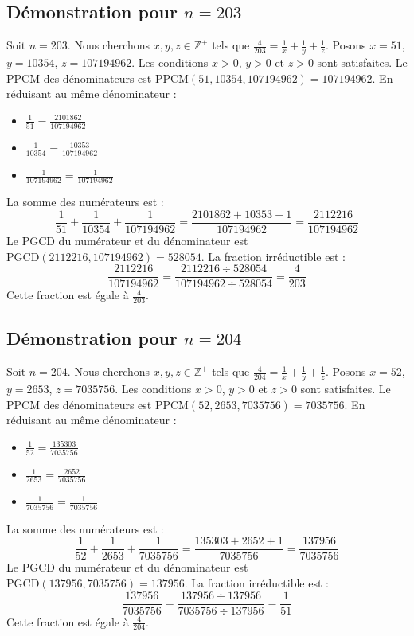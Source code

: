 \documentclass[11pt,a4paper]{article}
\begin{document}
\subsection{Démonstration pour $n = 203$}
Soit $n = 203$. Nous cherchons $x, y, z \in \mathbb{Z}^{+}$ tels que $\frac{4}{203} = \frac{1}{x} + \frac{1}{y} + \frac{1}{z}$.
Posons $x = 51$, $y = 10354$, $z = 107194962$.
Les conditions $x > 0$, $y > 0$ et $z > 0$ sont satisfaites.
Le PPCM des dénominateurs est $\text{PPCM}(51, 10354, 107194962) = 107194962$.
En réduisant au même dénominateur :
\begin{itemize}
    \item $\frac{1}{51} = \frac{2101862}{107194962}$
    \item $\frac{1}{10354} = \frac{10353}{107194962}$
    \item $\frac{1}{107194962} = \frac{1}{107194962}$
\end{itemize}
La somme des numérateurs est :
$$ \frac{1}{51} + \frac{1}{10354} + \frac{1}{107194962} = \frac{2101862 + 10353 + 1}{107194962} = \frac{2112216}{107194962} $$
Le PGCD du numérateur et du dénominateur est $\text{PGCD}(2112216, 107194962) = 528054$.
La fraction irréductible est :
$$ \frac{2112216}{107194962} = \frac{2112216 \div 528054}{107194962 \div 528054} = \frac{4}{203} $$
Cette fraction est égale à $\frac{4}{203}$.

\subsection{Démonstration pour $n = 204$}
Soit $n = 204$. Nous cherchons $x, y, z \in \mathbb{Z}^{+}$ tels que $\frac{4}{204} = \frac{1}{x} + \frac{1}{y} + \frac{1}{z}$.
Posons $x = 52$, $y = 2653$, $z = 7035756$.
Les conditions $x > 0$, $y > 0$ et $z > 0$ sont satisfaites.
Le PPCM des dénominateurs est $\text{PPCM}(52, 2653, 7035756) = 7035756$.
En réduisant au même dénominateur :
\begin{itemize}
    \item $\frac{1}{52} = \frac{135303}{7035756}$
    \item $\frac{1}{2653} = \frac{2652}{7035756}$
    \item $\frac{1}{7035756} = \frac{1}{7035756}$
\end{itemize}
La somme des numérateurs est :
$$ \frac{1}{52} + \frac{1}{2653} + \frac{1}{7035756} = \frac{135303 + 2652 + 1}{7035756} = \frac{137956}{7035756} $$
Le PGCD du numérateur et du dénominateur est $\text{PGCD}(137956, 7035756) = 137956$.
La fraction irréductible est :
$$ \frac{137956}{7035756} = \frac{137956 \div 137956}{7035756 \div 137956} = \frac{1}{51} $$
Cette fraction est égale à $\frac{4}{204}$.
\end{document}
